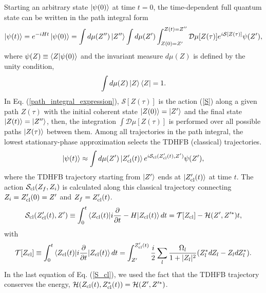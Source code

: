 \documentclass[%
superscriptaddress,
preprint,
showpacs,
nofootinbib,
amsmath,amssymb,
aps,
prc,
floatfix ]%
{revtex4-1}
\begin{document}
Starting an arbitrary state $\ket{\psi(0)}$ at time $t=0$,
the time-dependent full quantum state can be written in the path integral form
\begin{equation}
\ket{\psi(t)}
	= e^{-iHt} \ket{\psi(0)}
	= \int d\mu(Z'') \ket{Z''} \int d\mu(Z')
	\int_{Z(0)=Z'}^{Z(t)=Z''} \mathcal{D}\mu[Z(\tau)]
	e^{i\mathcal{S}[Z(\tau)]} \psi(Z') ,
\label{path_integral_expression}
\end{equation}
where $\psi(Z)\equiv \braket{Z|\psi(0)}$ and
the invariant measure $d\mu(Z)$ is defined by 
the unity condition,
\begin{equation}
  \int d\mu(Z) \ket{Z}\bra{Z} = 1 .
  \label{unity}
\end{equation}
In Eq. (\ref{path_integral_expression}),
$\mathcal{S}[Z(\tau)]$ is the action (\ref{S}) along a given path $Z(\tau)$
with the initial coherent state $\ket{Z(0)}=\ket{Z'}$ and
the final state $\ket{Z(t)}=\ket{Z''}$,
then, the integration $\int \mathcal {D}\mu[Z(\tau)]$
is performed over all possible paths $\ket{Z(\tau)}$ between them.
Among all trajectories in the path integral,
the lowest stationary-phase approximation selects
the TDHFB (classical) trajectories.
\begin{equation}
	\ket{\psi(t)} \approx \int d\mu(Z') \ket{Z'_{\rm cl}(t)}
	e^{i\mathcal{S}_{\rm cl}(Z'_{\rm cl}(t),Z')} \psi(Z') ,
	\label{SPA}
\end{equation}
where the TDHFB trajectory starting from $\ket{Z'}$
ends at $\ket{Z'_{\rm cl}(t)}$ at time $t$.
The action $\mathcal{S}_{\rm cl}(Z_f,Z_i)$ is calculated along this
classical trajectory
connecting $Z_i=Z'_{\rm cl}(0)=Z'$ and $Z_f=Z'_{\rm cl}(t)$.
\begin{equation}
	\mathcal{S}_{\rm cl}(Z'_{\rm cl}(t),Z') \equiv \int_{0}^{t}
\braket{Z_{\rm cl}(t)|
	i\frac{\partial}{\partial t} - H
	|Z_{\rm cl}(t)} dt
	= \mathcal{T}[Z_{\rm cl}] - \mathcal{H}(Z',Z'^*) t 
	,
	\label{S_cl}
\end{equation}
with
\begin{equation}
\mathcal{T}[Z_{\rm cl}]\equiv
\int_{0}^{t} \braket{Z_{\rm cl}(t)| i\frac{\partial}{\partial t}
	|Z_{\rm cl}(t)} dt 
	= \int_{Z'}^{Z'_{\rm cl}(t)}
	\frac{i}{2} \sum_l \frac{\Omega_l}{1+|Z_l|^2}
  (Z_l^* dZ_l - Z_l dZ_l^*) .
\end{equation}
In the last equation of Eq. (\ref{S_cl}),
we used the fact that the TDHFB trajectory conserves the energy,
$\mathcal{H}(Z_{\rm cl}(t),Z_{\rm cl}^*(t))= \mathcal{H}(Z',Z'^*)$.
\end{document}
